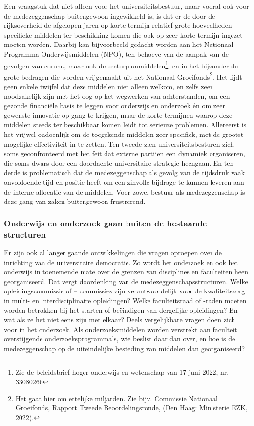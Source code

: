 \documentclass[empirical, authordate, ]{new-jote-article}
\begin{document}
	Een vraagstuk dat niet alleen voor het universiteitsbestuur, maar vooral ook voor de medezeggenschap buitengewoon ingewikkeld is, is dat er de door de rijksoverheid de afgelopen jaren op korte termijn relatief grote hoeveelheden specifieke middelen ter beschikking komen die ook op zeer korte termijn ingezet moeten worden. Daarbij kan bijvoorbeeld gedacht worden aan het Nationaal Programma Onderwijsmiddelen (NPO), ten behoeve van de aanpak van de gevolgen van corona, maar ook de sectorplanmiddelen\footnote{Zie de beleidsbrief hoger onderwijs en wetenschap van 17 juni 2022, nr. 33080266}, en in het bijzonder de grote bedragen die worden vrijgemaakt uit het Nationaal Groeifonds\footnote{Het gaat hier om ettelijke miljarden. Zie bijv. Commissie Nationaal Groeifonds, Rapport Tweede Beoordelingsronde, (Den Haag: Ministerie EZK, 2022).}. Het lijdt geen enkele twijfel dat deze middelen niet alleen welkom, en zelfs zeer noodzakelijk zijn met het oog op het wegwerken van achterstanden, om een gezonde financiële basis te leggen voor onderwijs en onderzoek én om zeer gewenste innovatie op gang te krijgen, maar de korte termijnen waarop deze middelen steeds ter beschikbaar komen leidt tot serieuze problemen. Allereerst is het vrijwel ondoenlijk om de toegekende middelen zeer specifiek, met de grootst mogelijke effectiviteit in te zetten. Ten tweede zien universiteitsbesturen zich soms geconfronteerd met het feit dat externe partijen een dynamiek organiseren, die soms dwars door een doordachte universitaire strategie heengaan. En ten derde is problematisch dat de medezeggenschap als gevolg van de tijdsdruk vaak onvoldoende tijd en positie heeft om een zinvolle bijdrage te kunnen leveren aan de interne allocatie van de middelen. Voor zowel bestuur als medezeggenschap is deze gang van zaken buitengewoon frustrerend.



	\subsubsection{Onderwijs en onderzoek gaan buiten de bestaande structuren}



	Er zijn ook al langer gaande ontwikkelingen die vragen oproepen over de inrichting van de universitaire democratie. Zo wordt het onderzoek en ook het onderwijs in toenemende mate over de grenzen van disciplines en faculteiten heen georganiseerd. Dat vergt doordenking van de medezeggenschapsstructuren. Welke opleidingscommissie of -- commissies zijn verantwoordelijk voor de kwaliteitszorg in multi- en interdisciplinaire opleidingen? Welke faculteitsraad of -raden moeten worden betrokken bij het starten of beëindigen van dergelijke opleidingen? En wat als ze het niet eens zijn met elkaar? Deels vergelijkbare vragen doen zich voor in het onderzoek. Als onderzoeksmiddelen worden verstrekt aan faculteit overstijgende onderzoeksprogramma's, wie beslist daar dan over, en hoe is de medezeggenschap op de uiteindelijke besteding van middelen dan georganiseerd?
\end{document}
